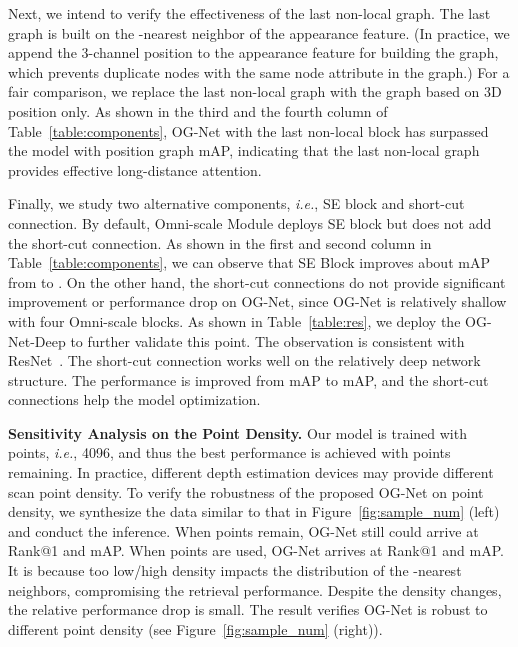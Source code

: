 \documentclass[journal]{IEEEtran}
\def\ie{\emph{i.e.}}
\begin{document}
Next, we intend to verify the effectiveness of the last non-local graph. The last graph is built on the -nearest neighbor of the appearance feature. (In practice, we append the 3-channel position to the appearance feature for building the graph, which prevents duplicate nodes with the same node attribute in the graph.) For a fair comparison, we replace the last non-local graph with the graph based on 3D position only. As shown in the third and the fourth column of Table~\ref{table:components}, OG-Net with the last non-local block has surpassed the model with position graph  mAP, indicating that the last non-local graph provides effective long-distance attention.  

Finally, we study two alternative components, \ie, SE block and short-cut connection. By default, Omni-scale Module deploys SE block but does not add the short-cut connection. As shown in the first and second column in Table~\ref{table:components}, we can observe that SE Block improves about  mAP from  to .
On the other hand, the short-cut connections do not provide significant improvement or performance drop on OG-Net, since OG-Net is relatively shallow with four Omni-scale blocks. As shown in Table~\ref{table:res}, we deploy the OG-Net-Deep to further validate this point. The observation is consistent with ResNet~\cite{he2016deep}. The short-cut connection works well on the relatively deep network structure. The performance is improved from  mAP to  mAP, and the short-cut connections help the model optimization. 

\noindent\textbf{Sensitivity Analysis on the Point Density.} Our model is trained with  points, \ie, 4096, and thus the best performance is achieved with  points remaining. In practice, different depth estimation devices may provide different scan point density. To verify the robustness of the proposed OG-Net on point density, we synthesize the data similar to that in Figure~\ref{fig:sample_num} (left) and conduct the inference. When  points remain, OG-Net still could arrive at  Rank@1 and  mAP. When  points are used, OG-Net arrives at  Rank@1 and  mAP. It is because too low/high density impacts the distribution of the -nearest neighbors, compromising the retrieval performance. Despite the density changes, the relative  performance drop is small. The result verifies OG-Net is robust to different point density (see Figure~\ref{fig:sample_num} (right)). 
\end{document}
